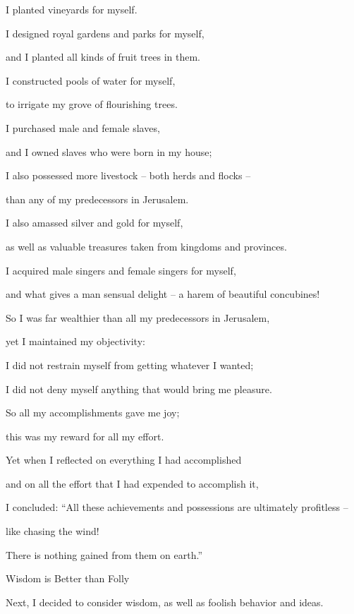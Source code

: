 {\par }{\Q I planted
vineyards for myself.
\par }{\Q {}I designed
royal gardens
and parks
for myself,
\par }{\Q and I planted
all
kinds of fruit
trees in them.
\par }{\Q {}I constructed
pools
of water
for myself,
\par }{\Q to irrigate
my grove
of flourishing
trees.
\par }{\Q {}I purchased
male and female slaves,
\par }{\Q and I owned slaves
who were born in my house;
\par }{\Q I also
possessed more livestock
– both herds
and flocks
–
\par }{\Q than
any
of my predecessors
in Jerusalem.
\par }{\Q {}I also
amassed
silver
and gold
for myself,
\par }{\Q as
well as valuable treasures
taken from kingdoms
and provinces.
\par }{\Q I acquired male singers
and female singers
for myself,
\par }{\Q and what gives a man
sensual delight –
a harem
of beautiful concubines!
\par }{\Q {}So I was far wealthier
than
all
my predecessors
in Jerusalem,
\par }{\Q yet
I maintained my objectivity:
\par }{\Q {}I did not
restrain
myself from getting whatever
I wanted;
\par }{\Q I did not
deny
myself
anything
that would bring me pleasure.
\par }{\Q So all
my accomplishments
gave
me joy;
\par }{\Q this
was
my reward
for all
my effort.
\par }{\Q {}Yet when I
reflected
on everything
I had accomplished
\par }{\Q and on all the effort
that I had expended
to accomplish
it,

\par }{\Q I concluded: “All these
achievements and possessions are ultimately profitless –
\par }{\Q like chasing
the wind!
\par }{\Q There is nothing
gained
from
them on earth.”
\par }{\SH Wisdom is Better than Folly
\par }{\Q {}Next, I
decided
to consider
wisdom,
as well as foolish behavior
and ideas.

}
